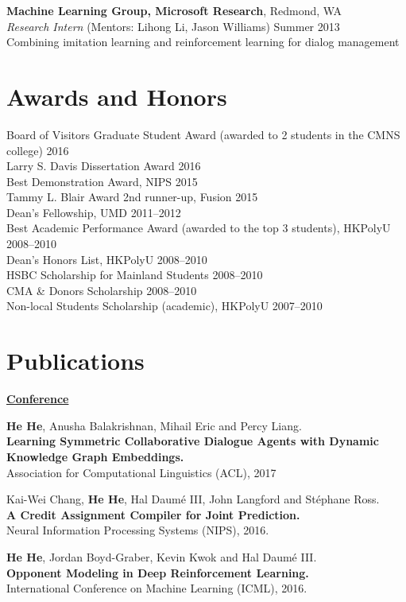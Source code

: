 \documentclass[margin,line]{resume}
\begin{document}
\begin{resume}
{\bf Machine Learning Group, Microsoft Research}, Redmond, WA\\
\emph{Research Intern} (Mentors: Lihong Li, Jason Williams) \hfill Summer 2013\\
Combining imitation learning and reinforcement learning for dialog management 

\section{\sc Awards and Honors}
Board of Visitors Graduate Student Award (awarded to 2 students in the CMNS college) \hfill 2016\\
Larry S. Davis Dissertation Award \hfill 2016\\
Best Demonstration Award, NIPS \hfill 2015\\
Tammy L. Blair Award 2nd runner-up, Fusion \hfill 2015\\
Dean's Fellowship, UMD \hfill 2011--2012 \\
Best Academic Performance Award (awarded to the top 3 students), HKPolyU \hfill 2008--2010\\
Dean's Honors List, HKPolyU \hfill 2008--2010\\
HSBC Scholarship for Mainland Students \hfill 2008--2010\\
CMA \& Donors Scholarship \hfill 2008--2010\\
Non-local Students Scholarship (academic), HKPolyU \hfill 2007--2010\\

\section{\sc Publications}
{\bf\underline{Conference}}

{\bf He He}, Anusha Balakrishnan, Mihail Eric and Percy Liang.\\
{\bf Learning Symmetric Collaborative Dialogue Agents with Dynamic Knowledge Graph Embeddings.}\\
Association for Computational Linguistics (ACL), 2017

Kai-Wei Chang, {\bf He He}, Hal Daum\'e III, John Langford and St\'ephane Ross.\\
{\bf A Credit Assignment Compiler for Joint Prediction.}\\
Neural Information Processing Systems (NIPS), 2016. 

{\bf He He}, Jordan Boyd-Graber, Kevin Kwok and Hal Daum\'e III.\\
{\bf Opponent Modeling in Deep Reinforcement Learning.}\\
International Conference on Machine Learning (ICML), 2016.


\end{resume}
\end{document}
